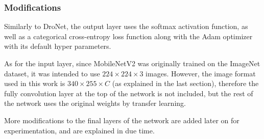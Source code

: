 \subsubsection{Modifications}

Similarly to DroNet, the output layer uses the softmax activation function, as
well as a categorical cross-entropy loss function along with the Adam optimizer
with its default hyper parameters.

As for the input layer, since MobileNetV2 was originally trained on the
ImageNet dataset, it was intended to use $224\times224\times3$ images. However,
the image format used in this work is $340\times255\times C$ (as explained in
the last section), therefore the fully convolution layer at the top of the
network is not included, but the rest of the network uses the original weights
by transfer learning.

More modifications to the final layers of the network are added later on for
experimentation, and are explained in due time.

